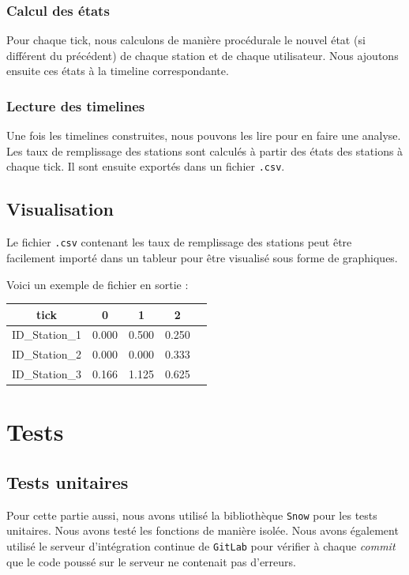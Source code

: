\documentclass[a4paper, 12pt]{report}
\begin{document}
\subsubsection{Calcul des états}
Pour chaque tick, nous calculons de manière procédurale le nouvel état (si différent du précédent) de chaque station et de chaque utilisateur. Nous ajoutons ensuite ces états à la timeline correspondante.\par\bigskip
\subsubsection{Lecture des timelines}
Une fois les timelines construites, nous pouvons les lire pour en faire une analyse. Les taux de remplissage des stations sont calculés à partir des états des stations à chaque tick. Il sont ensuite exportés dans un fichier \texttt{.csv}.\par\bigskip
\subsection{Visualisation}
Le fichier \texttt{.csv} contenant les taux de remplissage des stations peut être facilement importé dans un tableur pour être visualisé sous forme de graphiques.\par\bigskip
Voici un exemple de fichier en sortie :\par\bigskip
\begin{table}[htbp]
    \centering\begin{tabular}{|c|c|c|c|c|}
        \hline
        tick & 0 & 1 & 2 \\
        \hline\hline
        ID_Station_1 & 0.000 & 0.500 & 0.250 \\
        \hline
        ID_Station_2 & 0.000 & 0.000 & 0.333 \\
        \hline
        ID_Station_3 & 0.166 & 1.125 & 0.625 \\
        \hline
        \end{tabular}
\end{table}

\section{Tests}
\subsection{Tests unitaires}
Pour cette partie aussi, nous avons utilisé la bibliothèque \texttt{Snow} pour les tests unitaires. Nous avons testé les fonctions de manière isolée. Nous avons également utilisé le serveur d'intégration continue de \texttt{GitLab} pour vérifier à chaque \textit{commit} que le code poussé sur le serveur ne contenait pas d'erreurs.\par\bigskip
\end{document}
